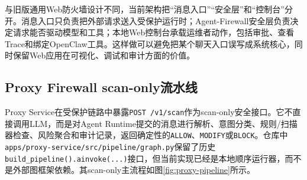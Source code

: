 \documentclass[UTF8,zihao=-4,scheme=chinese,fontset=none]{ctexart}
\newcommand{\code}[1]{{\ttfamily\small\nolinkurl{#1}}}
\begin{document}
与旧版通用Web防火墙设计不同，当前架构把“消息入口”“安全层”和“控制台”分开。消息入口只负责把外部请求送入受保护运行时；Agent-Firewall安全层负责决定请求能否驱动模型和工具；本地Web控制台承载运维者动作，包括审批、查看Trace和绑定OpenClaw工具。这样做可以避免把某个聊天入口误写成系统核心，同时保留Web应用在可视化、调试和审计方面的价值。

\subsection{Proxy Firewall scan-only流水线}

Proxy Service在受保护链路中暴露\code{POST /v1/scan}作为scan-only安全接口。它不直接调用LLM，而是对Agent Runtime提交的消息进行解析、意图分类、规则/扫描器检查、风险聚合和审计记录，返回确定性的\code{ALLOW}、\code{MODIFY}或\code{BLOCK}。仓库中\code{apps/proxy-service/src/pipeline/graph.py}保留了历史\code{build_pipeline().ainvoke(...)}接口，但当前实现已经是本地顺序运行器，而不是外部图框架依赖。其scan-only主流程如图\ref{fig:proxy-pipeline}所示。
\end{document}
